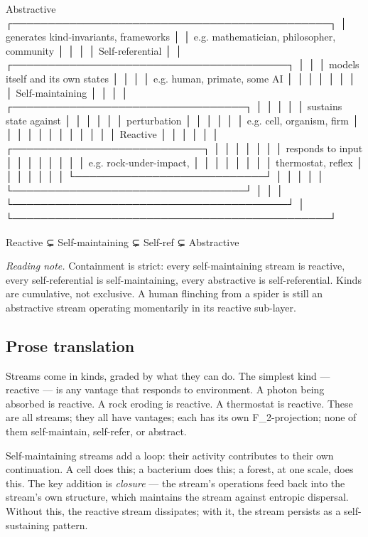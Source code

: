 \documentclass[11pt, openany]{book}
\begin{document}
\begin{Code}
  Abstractive
  ┌─────────────────────────────────────────────┐
  │  generates kind-invariants, frameworks      │
  │  e.g. mathematician, philosopher, community │
  │                                             │
  │  Self-referential                           │
  │  ┌───────────────────────────────────────┐  │
  │  │  models itself and its own states     │  │
  │  │  e.g. human, primate, some AI         │  │
  │  │                                       │  │
  │  │  Self-maintaining                     │  │
  │  │  ┌─────────────────────────────────┐  │  │
  │  │  │  sustains state against         │  │  │
  │  │  │  perturbation                   │  │  │
  │  │  │  e.g. cell, organism, firm      │  │  │
  │  │  │                                 │  │  │
  │  │  │  Reactive                       │  │  │
  │  │  │  ┌───────────────────────────┐  │  │  │
  │  │  │  │  responds to input        │  │  │  │
  │  │  │  │  e.g. rock-under-impact,  │  │  │  │
  │  │  │  │       thermostat, reflex  │  │  │  │
  │  │  │  └───────────────────────────┘  │  │  │
  │  │  └─────────────────────────────────┘  │  │
  │  └───────────────────────────────────────┘  │
  └─────────────────────────────────────────────┘

  Reactive ⊊ Self-maintaining ⊊ Self-ref ⊊ Abstractive
\end{Code}

\textit{Reading note.} Containment is strict: every self-maintaining stream is reactive, every self-referential is self-maintaining, every abstractive is self-referential. Kinds are cumulative, not exclusive. A human flinching from a spider is still an abstractive stream operating momentarily in its reactive sub-layer.

\subsection{Prose translation}

Streams come in kinds, graded by what they can do. The simplest kind --- reactive --- is any vantage that responds to environment. A photon being absorbed is reactive. A rock eroding is reactive. A thermostat is reactive. These are all streams; they all have vantages; each has its own F\_\allowbreak{}2-projection; none of them self-maintain, self-refer, or abstract.

Self-maintaining streams add a loop: their activity contributes to their own continuation. A cell does this; a bacterium does this; a forest, at one scale, does this. The key addition is \textit{closure} --- the stream's operations feed back into the stream's own structure, which maintains the stream against entropic dispersal. Without this, the reactive stream dissipates; with it, the stream persists as a self-sustaining pattern.
\end{document}
